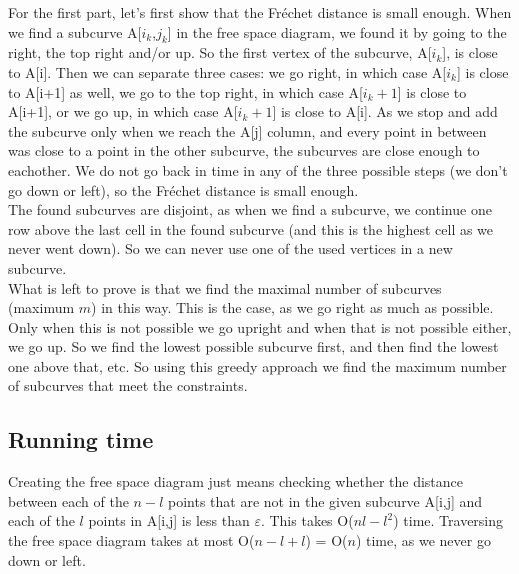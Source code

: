 \documentclass[a4paper,11pt]{article}
\begin{document}
For the first part, let's first show that the Fr\'{e}chet distance is small enough. When we find a subcurve A[$i_k$,$j_k$] in the free space diagram, we found it by going to the right, the top right and/or up. So the first vertex of the subcurve, A[$i_k$], is close to A[i]. Then we can separate three cases: we go right, in which case A[$i_k$] is close to A[i+1] as well, we go to the top right, in which case A[$i_k+1$] is close to A[i+1], or we go up, in which case A[$i_k+1$] is close to A[i]. As we stop and add the subcurve only when we reach the A[j] column, and every point in between was close to a point in the other subcurve, the subcurves are close enough to eachother. We do not go back in time in any of the three possible steps (we don't go down or left), so the Fr\'{e}chet distance is small enough.\\
The found subcurves are disjoint, as when we find a subcurve, we continue one row above the last cell in the found subcurve (and this is the highest cell as we never went down). So we can never use one of the used vertices in a new subcurve.\\

What is left to prove is that we find the maximal number of subcurves (maximum $m$) in this way. This is the case, as we go right as much as possible. Only when this is not possible we go upright and when that is not possible either, we go up. So we find the lowest possible subcurve first, and then find the lowest one above that, etc. So using this greedy approach we find the maximum number of subcurves that meet the constraints.

\subsection*{Running time}
Creating the free space diagram just means checking whether the distance between each of the $n-l$ points that are not in the given subcurve A[i,j] and each of the $l$ points in A[i,j] is less than $\varepsilon$. This takes O($nl-l^2$) time. Traversing the free space diagram takes at most O($n-l + l$) = O($n$) time, as we never go down or left.
\end{document}
